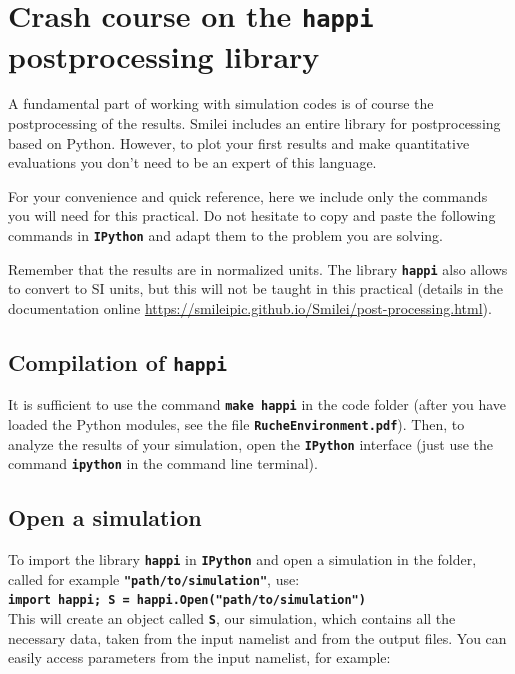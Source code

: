 \documentclass{article}
\newcommand{\smilei}{{\sc Smilei}\xspace}
\newcommand{\commandline}[1]{\texttt{\textbf{#1}}}
\begin{document}
\newpage


\section{Crash course on the \commandline{happi} postprocessing library}\label{happi}
A fundamental part of working with simulation codes is of course the postprocessing of the results. \smilei includes an entire library for postprocessing based on Python. However, to  plot your first results and make quantitative evaluations you don't need to be an expert of this language.

For your convenience and quick reference, here we include only the commands you will need for this practical. Do not hesitate to copy and paste the following commands in \commandline{IPython} and adapt them to the problem you are solving.

Remember that the results are in normalized units. The library \commandline{happi} also allows to convert to SI units, but this will not be taught in this practical (details in the documentation online \url{https://smileipic.github.io/Smilei/post-processing.html}).

\subsection*{Compilation of \commandline{happi}}
It is sufficient to use the command \commandline{make happi} in the code folder (after you have loaded the Python modules, see the file \commandline{RucheEnvironment.pdf}). Then, to analyze the results of your simulation, open the \commandline{IPython} interface (just use the command \commandline{ipython} in the command line terminal). 

\subsection*{Open a simulation}
To import the library \commandline{happi} in \commandline{IPython} and open a simulation in the folder,  called for example \commandline{"path/to/simulation"}, use:\\

\commandline{import happi; S =  happi.Open("path/to/simulation")}\\

This will create an object called \commandline{S}, our simulation, which contains all the necessary data, taken from the input namelist and from the output files. You can easily access parameters from the input namelist, for  example:\\
\end{document}
